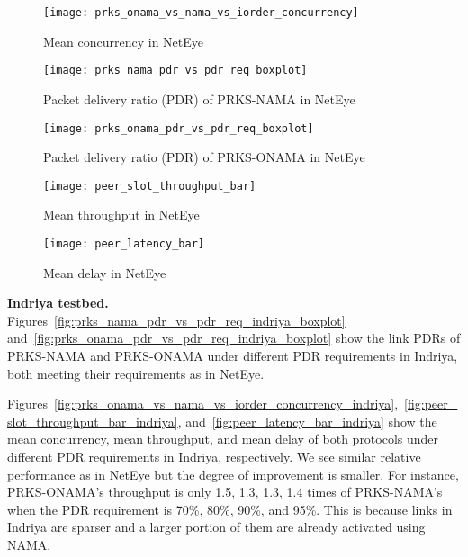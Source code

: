 \documentclass[conference]{IEEEtran}
\newcommand{\figWidth}{0.9\linewidth}	\newcommand{\figWidthM}{.99\linewidth}
\newcommand{\vSpacing}{\vspace*{0.05cm}}
\newcommand{\subHeading}[1]{
\vSpacing
\noindent \textbf{#1} \  
}
\begin{document}
\begin{figure}[!tbhp]
\centering
\texttt{[image: prks\_onama\_vs\_nama\_vs\_iorder\_concurrency]}
\caption{Mean concurrency in NetEye}
\label{fig:prks_onama_vs_nama_vs_iorder_concurrency}
\end{figure}


\begin{figure}[!tbhp]
\centering
\texttt{[image: prks\_nama\_pdr\_vs\_pdr\_req\_boxplot]}
\caption{Packet delivery ratio (PDR) of PRKS-NAMA in NetEye}
\label{fig:prks_nama_pdr_vs_pdr_req_boxplot}
\end{figure}


\begin{figure}[!tbhp]
\centering
\texttt{[image: prks\_onama\_pdr\_vs\_pdr\_req\_boxplot]}
\caption{Packet delivery ratio (PDR) of PRKS-ONAMA in NetEye}
\label{fig:prks_onama_pdr_vs_pdr_req_boxplot}
\end{figure}


\begin{figure}[!tbhp]
\centering
\texttt{[image: peer\_slot\_throughput\_bar]}
\caption{Mean throughput in NetEye}
\label{fig:peer_slot_throughput_bar}
\end{figure}

\begin{figure}[!tbhp]
\centering
\texttt{[image: peer\_latency\_bar]}
\caption{Mean delay in NetEye}
\label{fig:peer_latency_bar}
\end{figure}



\subHeading{Indriya testbed.}
Figures~\ref{fig:prks_nama_pdr_vs_pdr_req_indriya_boxplot} and~\ref{fig:prks_onama_pdr_vs_pdr_req_indriya_boxplot} show the link PDRs of PRKS-NAMA and PRKS-ONAMA under different PDR requirements in Indriya, both meeting their requirements as in NetEye.

Figures~\ref{fig:prks_onama_vs_nama_vs_iorder_concurrency_indriya},~\ref{fig:peer_slot_throughput_bar_indriya}, and~\ref{fig:peer_latency_bar_indriya} show the mean concurrency,
mean throughput, and mean delay of both protocols under different PDR requirements in Indriya, respectively. 
We see similar relative performance as in NetEye but the degree of improvement is smaller. For instance, PRKS-ONAMA's throughput is only 1.5, 1.3, 1.3, 1.4 times of PRKS-NAMA's when the PDR requirement is 70\%, 80\%, 90\%, and 95\%. This is because links in Indriya are sparser and a larger portion of them are already activated using NAMA.
\end{document}
